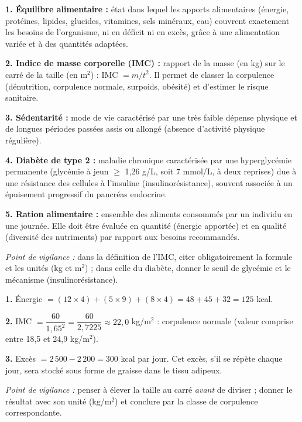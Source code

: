 \documentclass[11pt]{article}
\begin{document}
\begin{corrige}
\textbf{1. Équilibre alimentaire :} état dans lequel les apports alimentaires (énergie, protéines, lipides, glucides, vitamines, sels minéraux, eau) couvrent exactement les besoins de l'organisme, ni en déficit ni en excès, grâce à une alimentation variée et à des quantités adaptées.

\textbf{2. Indice de masse corporelle (IMC) :} rapport de la masse (en kg) sur le carré de la taille (en m$^2$) : IMC $= m/t^2$. Il permet de classer la corpulence (dénutrition, corpulence normale, surpoids, obésité) et d'estimer le risque sanitaire.

\textbf{3. Sédentarité :} mode de vie caractérisé par une très faible dépense physique et de longues périodes passées assis ou allongé (absence d'activité physique régulière).

\textbf{4. Diabète de type 2 :} maladie chronique caractérisée par une hyperglycémie permanente (glycémie à jeun $\geq$ 1,26 g/L, soit 7 mmol/L, à deux reprises) due à une résistance des cellules à l'insuline (insulinorésistance), souvent associée à un épuisement progressif du pancréas endocrine.

\textbf{5. Ration alimentaire :} ensemble des aliments consommés par un individu en une journée. Elle doit être évaluée en quantité (énergie apportée) et en qualité (diversité des nutriments) par rapport aux besoins recommandés.

\emph{Point de vigilance :} dans la définition de l'IMC, citer obligatoirement la formule et les unités (kg et m$^2$) ; dans celle du diabète, donner le seuil de glycémie et le mécanisme (insulinorésistance).
\end{corrige}

\begin{corrige}
\textbf{1.} Énergie $= (12 \times 4) + (5 \times 9) + (8 \times 4) = 48 + 45 + 32 = 125$ kcal.

\textbf{2.} IMC $= \dfrac{60}{1,65^2} = \dfrac{60}{2,7225} \approx 22,0$ kg/m$^2$ : corpulence normale (valeur comprise entre 18,5 et 24,9 kg/m$^2$).

\textbf{3.} Excès $= 2\,500 - 2\,200 = 300$ kcal par jour. Cet excès, s'il se répète chaque jour, sera stocké sous forme de graisse dans le tissu adipeux.

\emph{Point de vigilance :} penser à élever la taille au carré \emph{avant} de diviser ; donner le résultat avec son unité (kg/m$^2$) et conclure par la classe de corpulence correspondante.
\end{corrige}
\end{document}
